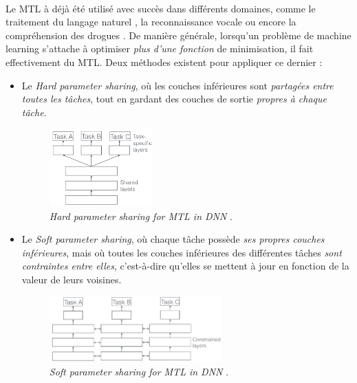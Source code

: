 \paragraph{} Le MTL à déjà été utilisé avec succès dans différents domaines, comme le traitement du langage naturel \cite{MultiLearning0},
la reconnaissance vocale \cite{MultiLearning1} ou encore la compréhension des drogues \cite{MultiLearning2}. De manière générale, lorsqu'un
problème de machine learning s'attache à optimiser \emph{plus d'une fonction} de minimisation, il fait effectivement du MTL. Deux méthodes 
existent pour appliquer ce dernier :

\begin{itemize}
    \item Le \emph{Hard parameter sharing}, où les couches inférieures sont \emph{partagées entre toutes les tâches}, tout en gardant
    des couches de sortie \emph{propres à chaque tâche}.
    \begin{figure}[ht]
        \centering
        \includegraphics[width=150px]{chapters/03/images/hard-param-sharing.png}
        \caption{\label{hard-param-sharing}\emph{Hard parameter sharing for MTL in DNN} \cite{NeuralNets0}.}
    \end{figure}

    \item Le \emph{Soft parameter sharing}, où chaque tâche possède \emph{ses propres couches inférieures}, mais où toutes les couches
    inférieures des différentes tâches \emph{sont contraintes entre elles}, c'est-à-dire qu'elles se mettent à jour en fonction de la valeur
    de leurs voisines.
    \begin{figure}[ht]
        \centering
        \includegraphics[width=250px]{chapters/03/images/soft-param-sharing.png}
        \caption{\label{soft-param-sharing}\emph{Soft parameter sharing for MTL in DNN} \cite{NeuralNets0}.}
    \end{figure}
\end{itemize}

